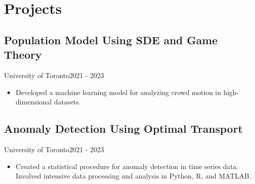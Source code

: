 \section{Projects}
\subsection{Population Model Using SDE and Game Theory}{University of Toronto}{2021 - 2023}
\begin{itemize}[leftmargin=*]
    \item Developed a machine learning model for analyzing crowd motion in high-dimensional datasets.
\end{itemize}
\subsection{Anomaly Detection Using Optimal Transport}{University of Toronto}{2021 - 2023}
\begin{itemize}[leftmargin=*]
    \item Created a statistical procedure for anomaly detection in time series data. Involved intensive data processing and analysis in Python, R, and MATLAB.
\end{itemize}
